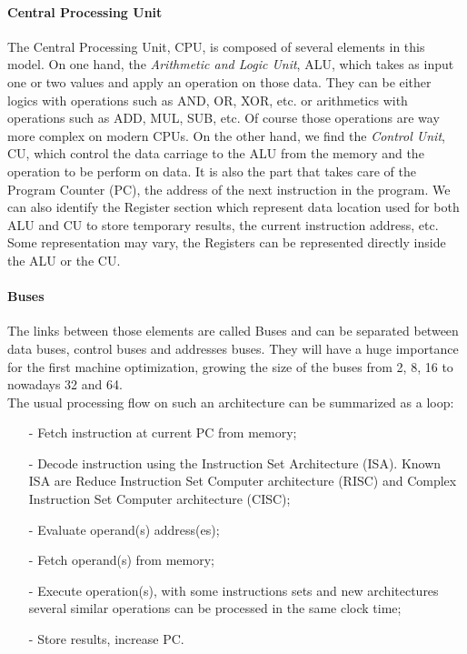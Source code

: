 \paragraph{Central Processing Unit}
The Central Processing Unit, CPU, is composed of several elements in this model. 
On one hand, the \textit{Arithmetic and Logic Unit}, ALU, which takes as input one or two values and apply an operation on those data. 
They can be either logics with operations such as AND, OR, XOR, etc. or arithmetics with operations such as ADD, MUL, SUB, etc. 
Of course those operations are way more complex on modern CPUs. 
On the other hand, we find the \textit{Control Unit}, CU, which control the data carriage to the ALU from the memory and the operation to be perform on data.
It is also the part that takes care of the Program Counter (PC), the address of the next instruction in the program. 
We can also identify the Register section which represent data location used for both ALU and CU to store temporary results, the current instruction address, etc. 
Some representation may vary, the Registers can be represented directly inside the ALU or the CU. 
\paragraph{Buses}
The links between those elements are called Buses and can be separated between data buses, control buses and addresses buses.
They will have a huge importance for the first machine optimization, growing the size of the buses from 2, 8, 16 to nowadays 32 and 64.\\

The usual processing flow on such an architecture can be summarized as a loop: 
\begin{itemize}[noitemsep,nolistsep]
\item[-] Fetch instruction at current PC from memory;
\item[-] Decode instruction using the Instruction Set Architecture (ISA). Known ISA are Reduce Instruction Set Computer architecture (RISC) and Complex Instruction Set Computer architecture (CISC);
\item[-] Evaluate operand(s) address(es);
\item[-] Fetch operand(s) from memory;
\item[-] Execute operation(s), with some instructions sets and new architectures several similar operations can be processed in the same clock time;
\item[-] Store results, increase PC.\\
\end{itemize}

